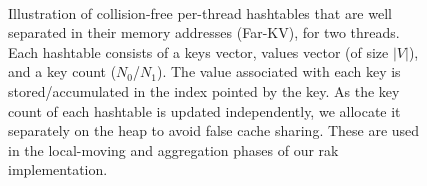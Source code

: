 \begin{figure}[hbtp]
  \centering
   \\[-2ex]
  \caption{Illustration of collision-free per-thread hashtables that are well separated in their memory addresses (Far-KV), for two threads. Each hashtable consists of a keys vector, values vector (of size $|V|$), and a key count ($N_0$/$N_1$). The value associated with each key is stored/accumulated in the index pointed by the key. As the key count of each hashtable is updated independently, we allocate it separately on the heap to avoid false cache sharing. These are used in the local-moving and aggregation phases of our rak implementation.}
  \label{fig:rak-hashtable}
\end{figure}
